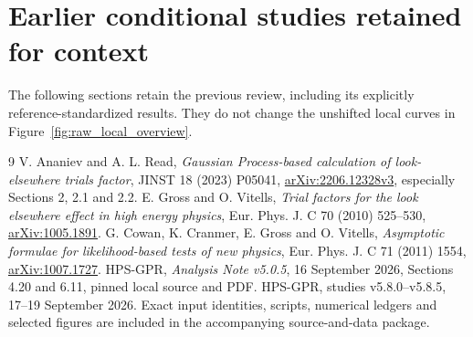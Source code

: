 \documentclass[11pt]{article}
\begin{document}
\section*{Earlier conditional studies retained for context}
The following sections retain the previous review, including its explicitly reference-standardized results. They do not change the unshifted local curves in Figure~\ref{fig:raw_local_overview}.


\FloatBarrier

\FloatBarrier

\FloatBarrier


\FloatBarrier
\begin{thebibliography}{9}
 V. Ananiev and A. L. Read, \textit{Gaussian Process-based calculation of look-elsewhere trials factor}, JINST 18 (2023) P05041, \href{https://arxiv.org/pdf/2206.12328}{arXiv:2206.12328v3}, especially Sections 2, 2.1 and 2.2.
 E. Gross and O. Vitells, \textit{Trial factors for the look elsewhere effect in high energy physics}, Eur. Phys. J. C 70 (2010) 525--530, \href{https://arxiv.org/abs/1005.1891}{arXiv:1005.1891}.
 G. Cowan, K. Cranmer, E. Gross and O. Vitells, \textit{Asymptotic formulae for likelihood-based tests of new physics}, Eur. Phys. J. C 71 (2011) 1554, \href{https://arxiv.org/abs/1007.1727}{arXiv:1007.1727}.
 HPS-GPR, \textit{Analysis Note v5.0.5}, 16 September 2026, Sections 4.20 and 6.11, pinned local source and PDF.
 HPS-GPR, studies v5.8.0--v5.8.5, 17--19 September 2026. Exact input identities, scripts, numerical ledgers and selected figures are included in the accompanying source-and-data package.
\end{thebibliography}
\end{document}
